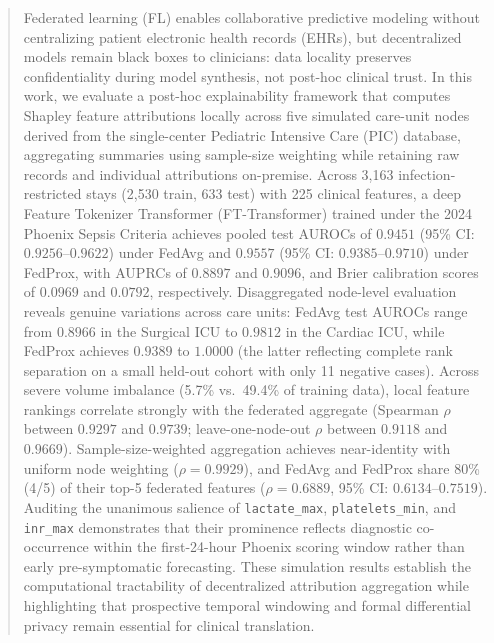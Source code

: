 \documentclass[runningheads]{llncs}
\begin{document}
\begin{abstract}
Federated learning (FL) enables collaborative predictive modeling without centralizing patient electronic health records (EHRs), but decentralized models remain black boxes to clinicians: data locality preserves confidentiality during model synthesis, not post-hoc clinical trust. In this work, we evaluate a post-hoc explainability framework that computes Shapley feature attributions locally across five simulated care-unit nodes derived from the single-center Pediatric Intensive Care (PIC) database, aggregating summaries using sample-size weighting while retaining raw records and individual attributions on-premise. Across 3,163 infection-restricted stays (2,530 train, 633 test) with 225 clinical features, a deep Feature Tokenizer Transformer (FT-Transformer) trained under the 2024 Phoenix Sepsis Criteria achieves pooled test AUROCs of $0.9451$ (95\% CI: $0.9256$--$0.9622$) under FedAvg and $0.9557$ (95\% CI: $0.9385$--$0.9710$) under FedProx, with AUPRCs of $0.8897$ and $0.9096$, and Brier calibration scores of $0.0969$ and $0.0792$, respectively. Disaggregated node-level evaluation reveals genuine variations across care units: FedAvg test AUROCs range from $0.8966$ in the Surgical ICU to $0.9812$ in the Cardiac ICU, while FedProx achieves $0.9389$ to $1.0000$ (the latter reflecting complete rank separation on a small held-out cohort with only 11 negative cases). Across severe volume imbalance (5.7\% vs.\ 49.4\% of training data), local feature rankings correlate strongly with the federated aggregate (Spearman $\rho$ between $0.9297$ and $0.9739$; leave-one-node-out $\rho$ between $0.9118$ and $0.9669$). Sample-size-weighted aggregation achieves near-identity with uniform node weighting ($\rho = 0.9929$), and FedAvg and FedProx share 80\% (4/5) of their top-5 federated features ($\rho = 0.6889$, 95\% CI: $0.6134$--$0.7519$). Auditing the unanimous salience of \texttt{lactate\_max}, \texttt{platelets\_min}, and \texttt{inr\_max} demonstrates that their prominence reflects diagnostic co-occurrence within the first-24-hour Phoenix scoring window rather than early pre-symptomatic forecasting. These simulation results establish the computational tractability of decentralized attribution aggregation while highlighting that prospective temporal windowing and formal differential privacy remain essential for clinical translation.
\end{abstract}
\end{document}

